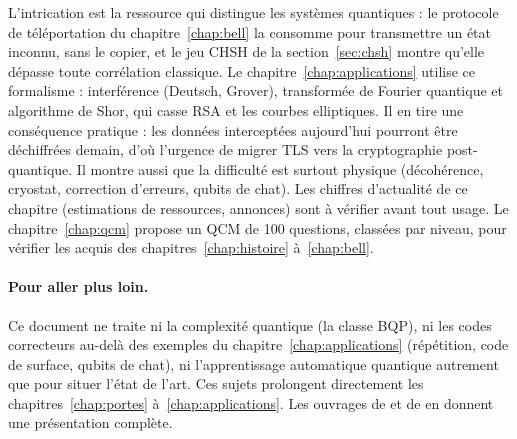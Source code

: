 L'intrication est la ressource qui distingue les systèmes quantiques : le protocole de
téléportation du chapitre~\ref{chap:bell} la consomme pour transmettre un état inconnu, sans le copier,
et le jeu CHSH de la section~\ref{sec:chsh} montre qu'elle dépasse toute corrélation classique.
Le chapitre~\ref{chap:applications} utilise ce formalisme : interférence (Deutsch, Grover), transformée de Fourier
quantique et algorithme de Shor, qui casse RSA et les courbes elliptiques. Il en tire une conséquence pratique : les données
interceptées aujourd'hui pourront être déchiffrées demain, d'où l'urgence de migrer TLS vers la cryptographie post-quantique.
Il montre aussi que la difficulté est surtout physique (décohérence, cryostat, correction d'erreurs, qubits de chat). Les chiffres
d'actualité de ce chapitre (estimations de ressources, annonces) sont à vérifier avant tout usage.
Le chapitre~\ref{chap:qcm} propose un QCM de 100 questions, classées par niveau, pour vérifier les acquis des chapitres~\ref{chap:histoire} à~\ref{chap:bell}.

\paragraph{Pour aller plus loin.} Ce document ne traite ni la complexité quantique (la classe BQP), ni les codes correcteurs
au-delà des exemples du chapitre~\ref{chap:applications} (répétition, code de surface, qubits de chat), ni l'apprentissage
automatique quantique autrement que pour situer l'état de l'art. Ces sujets prolongent directement les
chapitres~\ref{chap:portes} à~\ref{chap:applications}. Les ouvrages de \textcite{nielsen2010} et de
\textcite{mermin2007} en donnent une présentation complète.
